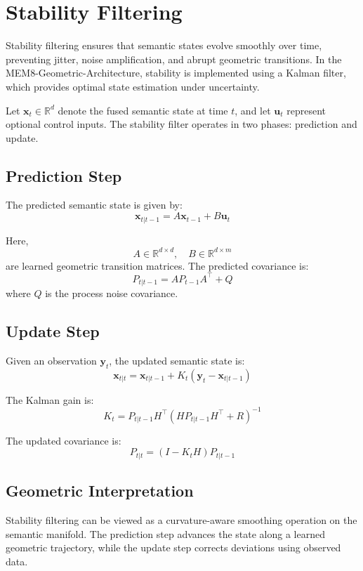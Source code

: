 \section{Stability Filtering}

Stability filtering ensures that semantic states evolve smoothly over time,
preventing jitter, noise amplification, and abrupt geometric transitions.
In the MEM8-Geometric-Architecture, stability is implemented using a Kalman
filter, which provides optimal state estimation under uncertainty.

Let $\mathbf{x}_t \in \mathbb{R}^d$ denote the fused semantic state at time $t$,
and let $\mathbf{u}_t$ represent optional control inputs. The stability filter
operates in two phases: prediction and update.

\subsection{Prediction Step}

The predicted semantic state is given by:
\[
\mathbf{x}_{t|t-1} = A \mathbf{x}_{t-1} + B \mathbf{u}_t
\]

Here,
\[
A \in \mathbb{R}^{d \times d}, \quad B \in \mathbb{R}^{d \times m}
\]
are learned geometric transition matrices. The predicted covariance is:
\[
P_{t|t-1} = A P_{t-1} A^\top + Q
\]
where $Q$ is the process noise covariance.

\subsection{Update Step}

Given an observation $\mathbf{y}_t$, the updated semantic state is:
\[
\mathbf{x}_{t|t} =
\mathbf{x}_{t|t-1} +
K_t (\mathbf{y}_t - \mathbf{x}_{t|t-1})
\]

The Kalman gain is:
\[
K_t =
P_{t|t-1} H^\top
\left(
H P_{t|t-1} H^\top + R
\right)^{-1}
\]

The updated covariance is:
\[
P_{t|t} = (I - K_t H) P_{t|t-1}
\]

\subsection{Geometric Interpretation}

Stability filtering can be viewed as a curvature-aware smoothing operation on
the semantic manifold. The prediction step advances the state along a learned
geometric trajectory, while the update step corrects deviations using observed
data.

